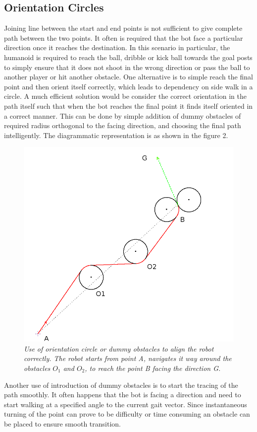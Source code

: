 \documentclass[letterpaper, 10 pt, conference]{ieeeconf}  %
\begin{document}
\subsection{Orientation Circles}
Joining line between the start and end points is not sufficient to give complete path between the two points. It often is required that the bot face a particular direction once it reaches the destination. In this scenario in particular, the humanoid is required to reach the ball, dribble or kick ball towards the goal posts to simply ensure that it does not shoot in the wrong direction or pass the ball to another player or hit another obstacle. One alternative is to simple reach the final point and then orient itself correctly, which leads to dependency on side walk in a circle. A much efficient solution would be consider the correct orientation in the path itself such that when the bot reaches the final point it finds itself oriented in a correct manner. This can be done by simple addition of dummy obstacles of required radius orthogonal to the facing direction, and choosing the final path intelligently. The diagrammatic representation is as shown in the figure 2. 
\begin{figure}[b]  
\begin{center}  
\includegraphics[scale=0.35]{orientation_circle2.JPG}  
\caption{\small \sl Use of orientation circle or dummy obstacles to align the robot correctly. The robot starts from point A, navigates it way around the obstacles $O_1$ and $O_2$, to reach the point B facing the direction G. \label{fig:orientation}}  
\end{center}  
\end{figure} 
Another use of introduction of dummy obstacles is to start the tracing of the path smoothly. It often happens that the bot is facing a direction and need to start walking at a specified angle to the current gait vector. Since instantaneous turning of the point can prove to be difficulty or time consuming an obstacle can be placed to ensure smooth transition.
\end{document}
